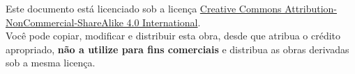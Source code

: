 \newpage
\thispagestyle{empty}

\begin{center}
    {\small Este documento está licenciado sob a licença \href{https://creativecommons.org/licenses/by-nc-sa/4.0/}{Creative Commons Attribution-NonCommercial-ShareAlike 4.0 International}.\\
    Você pode copiar, modificar e distribuir esta obra, desde que atribua o crédito apropriado, \textbf{não a utilize para fins comerciais} e distribua as obras derivadas sob a mesma licença.}
\end{center}
